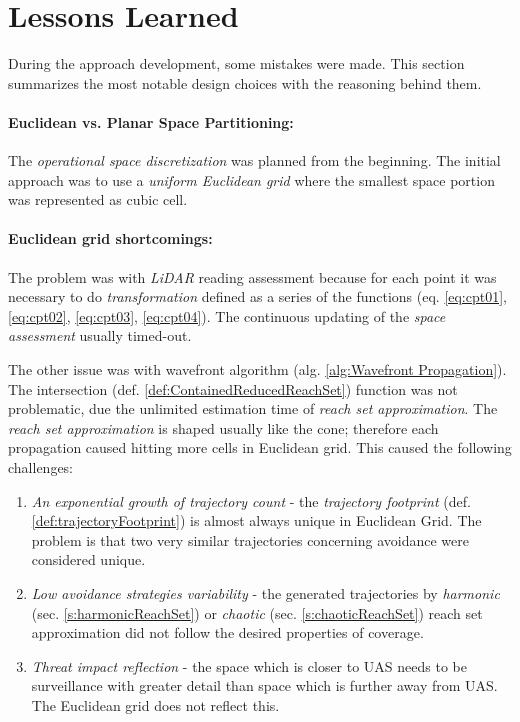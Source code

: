 \section{Lessons Learned}\label{s:lessonsLearned}
\noindent During the approach development, some mistakes were made. This section summarizes the most notable design choices with the reasoning behind them.

\paragraph{Euclidean vs. Planar Space Partitioning:} The \emph{operational space discretization} was planned from the beginning. The initial approach was to use a \emph{uniform Euclidean  grid} where the smallest space portion was represented as cubic cell.

\paragraph{Euclidean grid shortcomings:} The problem was with \emph{LiDAR} reading assessment because for each point it was necessary to do \emph{transformation} defined as  a series of the functions (eq. \ref{eq:cpt01}, \ref{eq:cpt02}, \ref{eq:cpt03}, \ref{eq:cpt04}). The continuous updating of the \emph{space assessment} usually timed-out. 

The other issue was with wavefront algorithm (alg. \ref{alg:Wavefront Propagation}). The intersection (def. \ref{def:ContainedReducedReachSet}) function was not problematic, due the unlimited estimation time of \emph{reach set approximation}. The \emph{reach set approximation} is shaped usually like the cone; therefore each propagation caused hitting more cells in Euclidean  grid. This caused the following challenges:

\begin{enumerate}
    \item \emph{An exponential growth of trajectory count} - the \emph{trajectory footprint} (def. \ref{def:trajectoryFootprint}) is almost always unique in Euclidean Grid. The problem is that two very similar trajectories concerning avoidance were considered unique.
    
    \item \emph{Low avoidance strategies variability} - the generated trajectories by \emph{harmonic} (sec. \ref{s:harmonicReachSet}) or \emph{chaotic} (sec. \ref{s:chaoticReachSet}) reach set approximation did not follow the desired properties of coverage.
    
    \item \emph{Threat impact reflection} - the space which is closer to UAS needs to be surveillance with greater detail than space which is further away from UAS. The Euclidean grid does not reflect this.
\end{enumerate}

